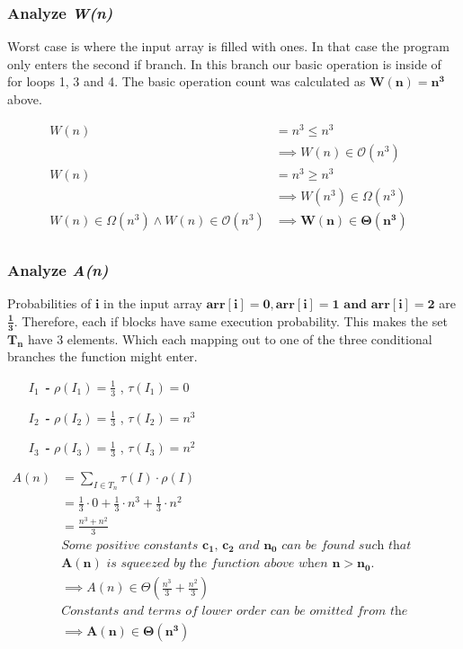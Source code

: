 \documentclass[10pt]{article}
\begin{document}
\subsubsection{Analyze \textit{W(n)}}
Worst case is where the input array is filled with ones. In that case the program only enters the second if branch. In this branch our basic operation is inside of for loops 1, 3 and 4. The basic operation count was calculated as $\mathbf{W(n) = n^3}$ above.

\begin{align*}
W(n) &= n^3 \le n^3 &\\
 &\implies W(n) \in \mathcal{O}(n^3) &\\
W(n) &= n^3 \ge n^3 &\\
 &\implies W(n^3) \in \Omega(n^3) &\\
 W(n) \in \Omega(n^3) \land W(n) \in \mathcal{O}(n^3) &\implies \mathbf{W(n) \boldsymbol{\in} \Theta(n^3)} &\\
\end{align*}

\subsubsection{Analyze \textit{A(n)}}
Probabilities of $\mathbf{i}$ in the input array $\mathbf{arr[i]=0 ,arr[i]=1 \text { and } arr[i]=2}$ are $\boldsymbol{\frac{1}{3}}$. Therefore, each if blocks have same execution probability. This makes the set $\mathbf{T_{n}}$ have 3 elements. Which each mapping out to one of the three conditional branches the function might enter. 
\begin{enumerate}[leftmargin=2.6cm]
    \item[\textit{\textbf{$I_{1}$ - }}] $\rho (\mathit{I_{1}}) = \frac{1}{3}$ ,  $\tau (\mathit{I_{1}})= 0$
    \item[\textit{\textbf{$I_{2}$ - }}] $\rho (\mathit{I_{2}}) = \frac{1}{3}$ ,  $\tau (\mathit{I_{2}}) = n^3$
    \item[\textit{\textbf{$I_{3}$ - }}] $\rho (\mathit{I_{3}}) = \frac{1}{3}$ ,  $\tau (\mathit{I_{3}}) = n^2$
\end{enumerate}

\begin{align*}
A(n) &= \displaystyle\sum _{I \in T_{n}} \tau (I) \cdot \rho (I) &&\\
 &= \frac{1}{3} \cdot 0 + \frac{1}{3} \cdot n^3 + \frac{1}{3} \cdot n^2 && \\
 &= \frac{n^3+n^2}{3}&& \\ 
 &\textit{Some positive constants $\mathbf{c_{1}}$, $\mathbf{c_{2}}$ and $\mathbf{n_{0}}$ can be found such that} && \\ 
 &\textit{$\mathbf{A(n)}$ is squeezed by the function above when $\mathbf{n > n_{0}}$.} && \\
 &\implies A(n) \in \Theta (\frac{n^3}{3}+ \frac{n^2}{3}) && \\
&\textit{Constants and terms of lower order can be omitted from the complexity class.} \\
&\implies \mathbf{A(n) \boldsymbol{\in} \Theta (n^3)} && \\
\end{align*}
\end{document}
